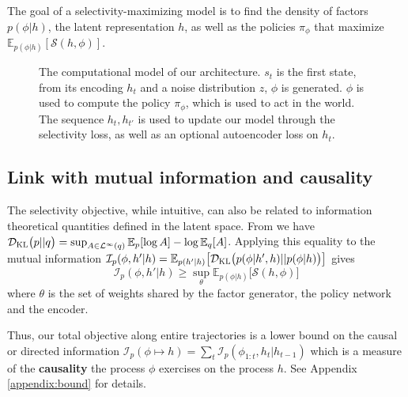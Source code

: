The goal of a selectivity-maximizing model is to find the density of factors $p(\phi |h)$, the latent representation $h$, as well as the policies $\pi_\phi$ that maximize $\mathbb{E}_{p(\phi|h)} [\mathcal{S}(h, \phi)]$.



\begin{figure}
\centering
{}
\caption{The computational model of our architecture. $s_t$ is the first state, from its encoding $h_t$ and a noise distribution $z$, $\phi$ is generated. $\phi$ is used to compute the policy $\pi_\phi$, which is used to act in the world. The sequence $h_t,h_{t'}$ is used to update our model through the selectivity loss, as well as an optional autoencoder loss on $h_t$.}
\end{figure}



\subsection{Link with mutual information and causality}
The selectivity objective, while intuitive, can also be related to information theoretical quantities defined in the latent space.
From \citep{donsker1975asymptotic,ruderman2012tighter} we have
${\mathcal{D}}_{\textsc{KL}}\big(p||q\big) = \sup_{A\in \mathcal{L}^\infty(q)} \mathbb{E}_p [ \log A] - \log \mathbb{E}_q [A]$.
Applying this equality to the mutual information $\mathcal{I}_p(\phi, h' | h) = \mathbb{E}_{p(h'|h)}\big[ {\mathcal{D}}_{\textsc{KL}}\big(p(\phi|h', h)||p(\phi|h)\big)\big]$
gives
$$\mathcal{I}_p(\phi, h' | h) \ge \sup_\theta  \mathbb{E}_{p(\phi|h)} \big[ \mathcal{S}(h, \phi)\big]$$
where $\theta$ is the set of weights shared by the factor generator, the policy network and the encoder.

Thus, our total objective along entire trajectories is a lower bound on the causal \citep{ziebart2010modeling} or directed \citep{massey1990causality} information $\mathcal{I}_p(\phi \mapsto h) = \sum_t \mathcal{I}_p(\phi_{1:t}, h_t|h_{t-1})$ which is a measure of the \textbf{causality} the process $\phi$ exercises on the process $h$. See Appendix \ref{appendix:bound} for details.



